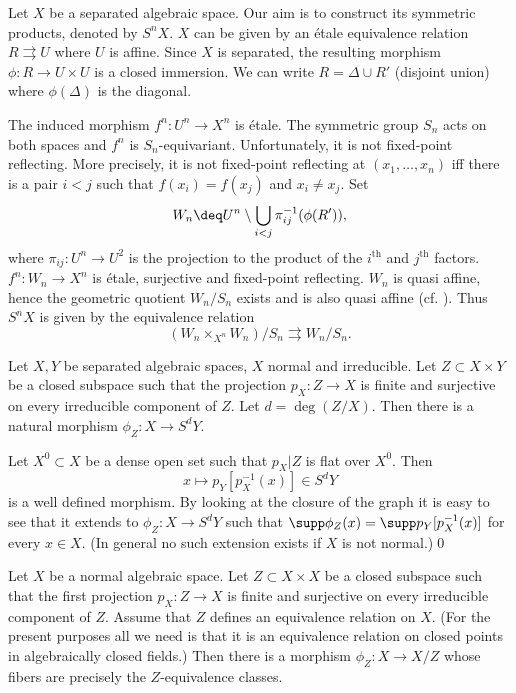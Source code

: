  Let $X$ be a separated
algebraic space. Our aim is to construct its symmetric products, denoted by
$S^nX$. $X$ can be given by an \'etale equivalence relation
$R\rightrightarrows U$ where $U$ is affine. Since
$X$ is separated, the resulting morphism $\phi:R\to U\times U$ is a closed
immersion. We can write $R=\Delta\cup R'$ (disjoint union) where
$\phi(\Delta)$ is the diagonal.

The induced morphism $f^n:U^n\to X^n$ is \'etale. The symmetric group $S_n$
acts on both spaces and  $f^n$ is $S_n$-equivariant.  Unfortunately, it is
not fixed-point reflecting. More precisely, it is not fixed-point reflecting
at $(x_1,\dots,x_n)$ iff there is a pair $i<j$ such that $f(x_i)=f(x_j)$ and
$x_i\neq x_j$.
Set
$$
W_n\deq U^n\setminus \bigcup_{i<j} \pi_{ij}^{-1}(\phi(R')),
$$
where $\pi_{ij}:U^n\to U^2$ is the projection to the product of the
$i^{\text{th}}$ and
$j^{\text{th}}$ factors.    $f^n:W_n\to  X^n$ is \'etale, surjective and
fixed-point reflecting.  $W_n$ is quasi affine, hence the geometric quotient
$W_n/S_n$  exists and is  also quasi affine (cf. \cite{Mumford68, Sec. 12}).
Thus
$S^nX$ is given by the equivalence relation
$$
(W_n\times_{X^n}W_n)/S_n \rightrightarrows W_n/S_n.
$$
\enddemo

  Let $X,Y$ be separated algebraic spaces, $X$ normal
and irreducible. Let $Z\subset X\times Y$ be a closed subspace such that the
projection
$p_X:Z\to X$ is finite and surjective on every irreducible component of $Z$.
Let $d=\deg (Z/X)$. Then there is a natural morphism
$\phi_Z:X\to S^d Y$.
\endproclaim

\demop Let $X^0\subset X$ be a dense open set such that $p_X|Z$ is flat over
$X^0$. Then
$$
x\mapsto p_Y[p_X^{-1}(x)]\in  S^dY
$$
is a well defined morphism. By looking at the closure of the graph it is easy
to see that it extends to $\phi_Z:X\to S^d Y$ such that
$\supp \phi_Z(x)=\supp p_Y[p_X^{-1}(x)]$ for every $x\in X$. (In general no
such extension exists if
$X$ is not normal.)\qed\enddemo


  Let $X$ be a normal algebraic space. Let $Z\subset
X\times X$ be a closed subspace such that the first projection
$p_X:Z\to X$ is finite and surjective on every irreducible component of $Z$.
  Assume that $Z$ defines an equivalence relation on
$X$. (For the present purposes all we need is that it is an equivalence
relation on closed points in algebraically closed fields.) Then there is a
 morphism
$\phi_Z:X\to X/Z$ whose fibers are precisely the $Z$-equivalence classes.
\endproclaim

